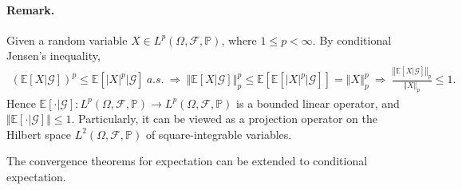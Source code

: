 \documentclass{article}
\numberwithin{equation}{section}
\newcommand{\E}{\mathbb{E}}
\renewcommand{\P}{\mathbb{P}}
\theoremstyle{plain}
\theoremstyle{definition}
\begin{document}
\paragraph{Remark.} Given a random variable $X\in L^p(\Omega,\mathscr{F},\P)$, where $1\leq p < \infty$. By conditional Jensen's inequality,
\begin{align*}
	\left(\E[X|\mathscr{G}]\right)^p\leq\E\left[\vert X\vert^p|\mathscr{G}\right]\ a.s.\ \Rightarrow\ \left\Vert\E[X|\mathscr{G}]\right\Vert_p^p \leq \E\left[\E\left[\vert X\vert^p|\mathscr{G}\right]\right] = \left\Vert X\right\Vert_p^p\ \Rightarrow\ \frac{\left\Vert\E[X|\mathscr{G}]\right\Vert_p}{\left\Vert X\right\Vert_p}\leq 1.
\end{align*}
Hence $\E[\cdot|\mathscr{G}]:L^p(\Omega,\mathscr{F},\P)\to L^p(\Omega,\mathscr{F},\P)$ is a bounded linear operator, and $\Vert\E[\cdot|\mathscr{G}]\Vert\leq 1$. Particularly, it can be viewed as a projection operator on the Hilbert space $L^2(\Omega,\mathscr{F},\P)$ of square-integrable variables. \vspace{0.1cm}

The convergence theorems for expectation can be extended to conditional expectation.
\end{document}
